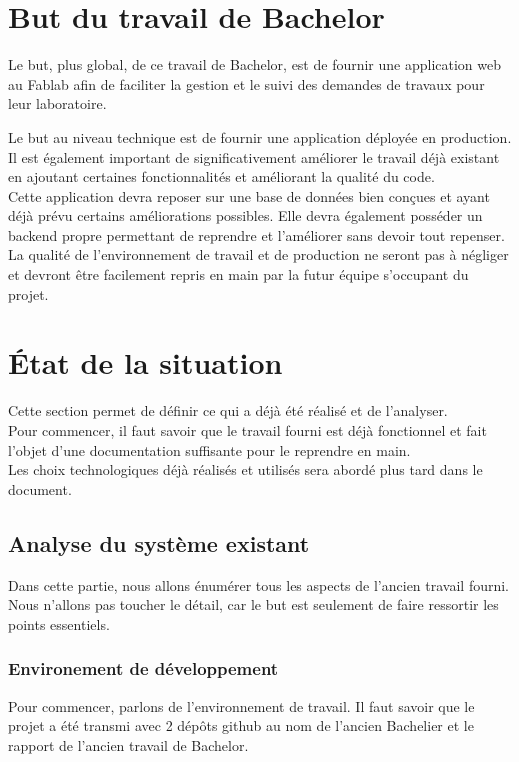 \documentclass[
    iai, %
    il, %
]{heig-tb}
\begin{document}
\section{But du travail de Bachelor}
Le but, plus global, de ce travail de Bachelor, est de fournir une application web au Fablab afin de faciliter la gestion et le suivi des demandes de travaux pour leur laboratoire.

Le but au niveau technique est de fournir une application déployée en production.\\
Il est également important de significativement améliorer le travail déjà existant en ajoutant certaines fonctionnalités et améliorant la qualité du code.\\
Cette application devra reposer sur une base de données bien conçues et ayant déjà prévu certains améliorations possibles. Elle devra également posséder un backend propre permettant de reprendre et l'améliorer sans devoir tout repenser.\\
La qualité de l'environnement de travail et de production ne seront pas à négliger et devront être facilement repris en main par la futur équipe s'occupant du projet.

\section{État de la situation}
Cette section permet de définir ce qui a déjà été réalisé et de l'analyser.\\
Pour commencer, il faut savoir que le travail fourni est déjà fonctionnel et fait l'objet d'une documentation suffisante pour le reprendre en main.\\
Les choix technologiques déjà réalisés et utilisés sera abordé plus tard dans le document.

\subsection{Analyse du système existant}
Dans cette partie, nous allons énumérer tous les aspects de l'ancien travail fourni. Nous n'allons
pas toucher le détail, car le but est seulement de faire ressortir les points essentiels.

\subsubsection{Environement de développement}
Pour commencer, parlons de l'environnement de travail. Il faut savoir que le projet a été transmi avec 2 dépôts \Gls{github} au nom de l'ancien Bachelier et le rapport de l'ancien travail de Bachelor.
\end{document}
